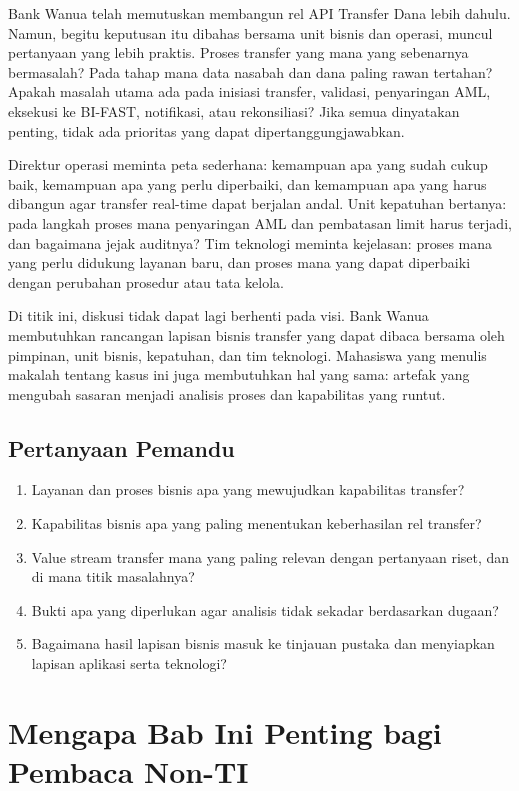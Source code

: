 Bank Wanua telah memutuskan membangun rel API Transfer Dana lebih dahulu. Namun,
begitu keputusan itu dibahas bersama unit bisnis dan operasi, muncul pertanyaan
yang lebih praktis. Proses transfer yang mana yang sebenarnya bermasalah? Pada
tahap mana data nasabah dan dana paling rawan tertahan? Apakah masalah utama ada
pada inisiasi transfer, validasi, penyaringan AML, eksekusi ke BI-FAST,
notifikasi, atau rekonsiliasi? Jika semua dinyatakan penting, tidak ada
prioritas yang dapat dipertanggungjawabkan.

Direktur operasi meminta peta sederhana: kemampuan apa yang sudah cukup baik,
kemampuan apa yang perlu diperbaiki, dan kemampuan apa yang harus dibangun agar
transfer real-time dapat berjalan andal. Unit kepatuhan bertanya: pada langkah
proses mana penyaringan AML dan pembatasan limit harus terjadi, dan bagaimana
jejak auditnya? Tim teknologi meminta kejelasan: proses mana yang perlu
didukung layanan baru, dan proses mana yang dapat diperbaiki dengan perubahan
prosedur atau tata kelola.

Di titik ini, diskusi tidak dapat lagi berhenti pada visi. Bank Wanua
membutuhkan rancangan lapisan bisnis transfer yang dapat dibaca bersama oleh
pimpinan, unit bisnis, kepatuhan, dan tim teknologi. Mahasiswa yang menulis
makalah tentang kasus ini juga membutuhkan hal yang sama: artefak yang mengubah
sasaran menjadi analisis proses dan kapabilitas yang runtut.

\subsection*{Pertanyaan Pemandu}

\begin{enumerate}
  \item Layanan dan proses bisnis apa yang mewujudkan kapabilitas transfer?
  \item Kapabilitas bisnis apa yang paling menentukan keberhasilan rel transfer?
  \item Value stream transfer mana yang paling relevan dengan pertanyaan riset,
        dan di mana titik masalahnya?
  \item Bukti apa yang diperlukan agar analisis tidak sekadar berdasarkan
        dugaan?
  \item Bagaimana hasil lapisan bisnis masuk ke tinjauan pustaka dan menyiapkan
        lapisan aplikasi serta teknologi?
\end{enumerate}

\section{Mengapa Bab Ini Penting bagi Pembaca Non-TI}

